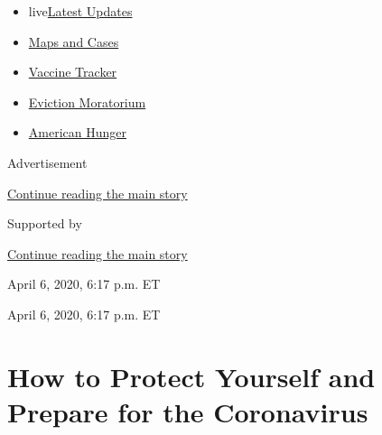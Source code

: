 \begin{itemize}
\tightlist
\item
  live\href{https://www.nytimes3xbfgragh.onion/2020/09/05/world/coronavirus-covid.html?name=styln-coronavirus\&region=TOP_BANNER\&block=storyline_menu_recirc\&action=click\&pgtype=Article\&impression_id=0a1cb001-efb6-11ea-9b73-5bf71047ff35\&variant=undefined}{Latest
  Updates}
\item
  \href{https://www.nytimes3xbfgragh.onion/interactive/2020/us/coronavirus-us-cases.html?name=styln-coronavirus\&region=TOP_BANNER\&block=storyline_menu_recirc\&action=click\&pgtype=Article\&impression_id=0a1cd710-efb6-11ea-9b73-5bf71047ff35\&variant=undefined}{Maps
  and Cases}
\item
  \href{https://www.nytimes3xbfgragh.onion/interactive/2020/science/coronavirus-vaccine-tracker.html?name=styln-coronavirus\&region=TOP_BANNER\&block=storyline_menu_recirc\&action=click\&pgtype=Article\&impression_id=0a1cd711-efb6-11ea-9b73-5bf71047ff35\&variant=undefined}{Vaccine
  Tracker}
\item
  \href{https://www.nytimes3xbfgragh.onion/2020/09/02/your-money/eviction-moratorium-covid.html?name=styln-coronavirus\&region=TOP_BANNER\&block=storyline_menu_recirc\&action=click\&pgtype=Article\&impression_id=0a1cd712-efb6-11ea-9b73-5bf71047ff35\&variant=undefined}{Eviction
  Moratorium}
\item
  \href{https://www.nytimes3xbfgragh.onion/interactive/2020/09/02/magazine/food-insecurity-hunger-us.html?name=styln-coronavirus\&region=TOP_BANNER\&block=storyline_menu_recirc\&action=click\&pgtype=Article\&impression_id=0a1cd713-efb6-11ea-9b73-5bf71047ff35\&variant=undefined}{American
  Hunger}
\end{itemize}

Advertisement

\protect\hyperlink{after-top}{Continue reading the main story}

Supported by

\protect\hyperlink{after-sponsor}{Continue reading the main story}

April 6, 2020, 6:17 p.m. ET

April 6, 2020, 6:17 p.m. ET

\hypertarget{how-to-protect-yourself-and-prepare-for-the-coronavirus}{%
\section{How to Protect Yourself and Prepare for the
Coronavirus}\label{how-to-protect-yourself-and-prepare-for-the-coronavirus}}

